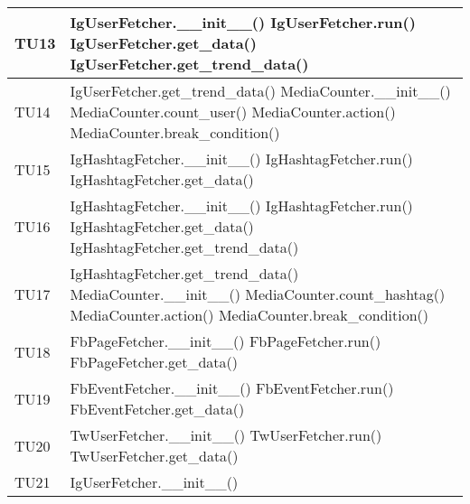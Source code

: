 \begin{center}
\begin{longtable}{| p{3cm} | p{9.5cm} |}
					\hline
					TU13 & IgUserFetcher.\_\_init\_\_() \newline
					IgUserFetcher.run() \newline
					IgUserFetcher.get\_data() \newline
					IgUserFetcher.get\_trend\_data() \\
					\hline
					TU14 & IgUserFetcher.get\_trend\_data() \newline
					MediaCounter.\_\_init\_\_() \newline
					MediaCounter.count\_user() \newline
					MediaCounter.action() \newline
					MediaCounter.break\_condition()\\
					\hline
					TU15 & IgHashtagFetcher.\_\_init\_\_() \newline
					IgHashtagFetcher.run() \newline
					IgHashtagFetcher.get\_data() \\
					\hline
					TU16 & IgHashtagFetcher.\_\_init\_\_() \newline
					IgHashtagFetcher.run() \newline
					IgHashtagFetcher.get\_data() \newline
					IgHashtagFetcher.get\_trend\_data()\\
					\hline
					TU17 & IgHashtagFetcher.get\_trend\_data() \newline
					MediaCounter.\_\_init\_\_() \newline
					MediaCounter.count\_hashtag() \newline
					MediaCounter.action() \newline
					MediaCounter.break\_condition()\\
					\hline
					TU18 & FbPageFetcher.\_\_init\_\_() \newline
					FbPageFetcher.run() \newline
					FbPageFetcher.get\_data() \\
					\hline
					TU19 & FbEventFetcher.\_\_init\_\_() \newline
					FbEventFetcher.run() \newline
					FbEventFetcher.get\_data() \\
					\hline
					TU20 & TwUserFetcher.\_\_init\_\_() \newline
					TwUserFetcher.run() \newline
					TwUserFetcher.get\_data() \\
					\hline
					TU21 & IgUserFetcher.\_\_init\_\_() \newline

\end{longtable}
\end{center}

